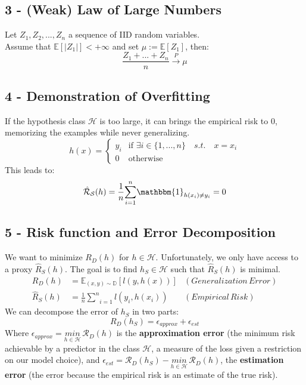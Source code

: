 \documentclass{homework}
\begin{document}
\subsection*{3 - (Weak) Law of Large Numbers}
Let $Z_1, Z_2,...,Z_n$ a sequence of IID random variables.\\Assume that $\mathbb{E}[|Z_1|]<+\infty$ and set $\mu:=\mathbb{E}[Z_1]$, then:
$$\frac{Z_1+...+Z_n}{n}\overset{P}{\rightarrow}\mu$$
\subsection*{4 - Demonstration of Overfitting}
If the hypothesis class $\mathcal{H}$ is too large, it can brings the empirical risk to $0$, memorizing the examples while never generalizing.
\begin{equation*}
  h(x) =
    \begin{cases}
      y_i & \text{if $\exists i\in\{1,...,n\}\quad{s.t.}\quad x=x_i$}\\
      0 & \text{otherwise}
    \end{cases}       
\end{equation*}
This leads to:
$$\hat{\mathcal{R}}_{\mathcal{S}}(h)=\frac{1}{n}\underset{i=1}{\overset{n}{\sum}}\mathbbm{1}_{h(x_i)\neq y_i}=0$$
\subsection*{5 - Risk function and Error Decomposition}
We want to minimize $R_D(h)$ for $h\in \mathcal{H}$. Unfortunately, we only have access to a proxy $\hat{R}_S(h)$. The goal is to find $h_S \in \mathcal{H}$ such that $\hat{R}_S(h)$ is minimal.
\begin{align*}
R_D(h)&=\mathbb{E}_{(x,y)\sim\mathbb{D}}[l(y,h(x))]&(Generalization\,Error)\\
\hat{R}_S(h)&=\frac{1}{n}\underset{i=1}{\overset{n}{\sum}}l(y_i,h(x_i))&(Empirical\,Risk)
\end{align*}
We can decompose the error of $h_S$ in two parts: $$R_D(h_S)=\epsilon_{approx} + \epsilon_{est}$$
Where $\epsilon_{approx} = \underset{h\in\mathcal{H}}{min}\,\mathcal{R}_D(h)$ is the \textbf{approximation error} (the minimum risk achievable by a predictor in the class $\mathcal{H}$, a measure of the loss given a restriction on our model choice), and $\epsilon_{est}=\mathcal{R}_D(h_S) - \underset{h\in\mathcal{H}}{min}\,\mathcal{R}_D(h)$, the \textbf{estimation error} (the error because the empirical risk is an estimate of the true risk).
\end{document}
